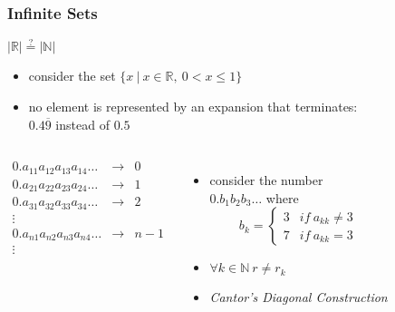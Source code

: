 \documentclass[dvipsnames]{beamer}
\begin{document}
\begin{frame}
  \frametitle{Infinite Sets}

  \begin{block}{$|\mathbb{R}| \stackrel{?}{=} |\mathbb{N}|$}
    \begin{itemize}
      \item consider the set $\{x~|~x \in \mathbb{R},~0 < x \leq 1\}$
      \item no element is represented by an expansion that terminates:\\
        $0.4\overline{9}$ instead of $0.5$
    \end{itemize}

    \vspace{-2em}
    \begin{columns}[t]
      \[
      \begin{array}{lcl}
        0.a_{11}a_{12}a_{13}a_{14}\ldots & \rightarrow & 0\\
        0.a_{21}a_{22}a_{23}a_{24}\ldots & \rightarrow & 1\\
        0.a_{31}a_{32}a_{33}a_{34}\ldots & \rightarrow & 2\\
        \vdots                           &             &\\
        0.a_{n1}a_{n2}a_{n3}a_{n4}\ldots & \rightarrow & n-1\\
        \vdots                           &             &
      \end{array}
      \]

      \pause
      \begin{itemize}
        \item consider the number\\
          $0.b_1b_2b_3\ldots$ where
        \begin{equation*}
          b_k = \left\{
            \begin{array}{ll}
              3 & if~a_{kk} \neq 3\\
              7 & if~a_{kk} = 3
            \end{array}\right.
        \end{equation*}

        \pause
        \item $\forall k \in \mathbb{N}~r \neq r_k$
        \item \emph{Cantor's Diagonal Construction}
      \end{itemize}
    \end{columns}
  \end{block}
\end{frame}
\end{document}
